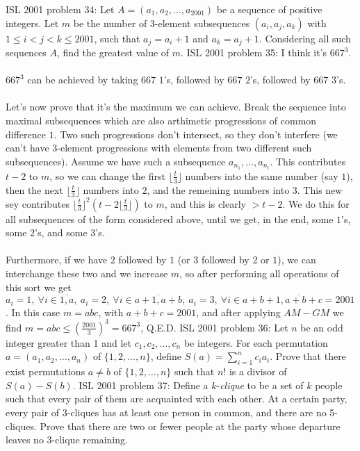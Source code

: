 ISL 2001 problem 34:  Let $A = (a_1, a_2, \ldots, a_{2001})$ be a sequence of positive integers. Let $m$ be the number of 3-element subsequences $(a_i,a_j,a_k)$ with $1 \leq i < j < k \leq 2001$, such that $a_j = a_i + 1$ and $a_k = a_j + 1$.  Considering all such sequences $A$, find the greatest value of $m$. 
ISL 2001 problem 35:  I think it's $667^3$. \\\\
$667^3$ can be achieved by taking $667$ $1$'s, followed by $667$ $2$'s, followed by $667$ $3$'s. \\\\
Let's now prove that it's the maximum we can achieve. Break the sequence into maximal subsequences which are also arthimetic progressions of common difference $1$. Two such progressions don't intersect, so they don't interfere (we can't have $3$-element progressions with elements from two different such subsequences). Assume we have such a subsequence $a_{n_1},\ldots,a_{n_t}$. This contributes $t-2$ to $m$, so we can change the first $\lfloor\frac t3 \rfloor$ numbers into the same number (say $1$), then the next $\lfloor\frac t3\rfloor$ numbers into $2$, and the remeining numbers into $3$. This new sey contributes $\lfloor\frac t3 \rfloor^2(t-2\lfloor\frac t3 \rfloor)$ to $m$, and this is clearly $>t-2$. We do this for all subsequences of the form considered above, until we get, in the end, some $1$'s, some $2$'s, and some $3$'s. \\\\
Furthermore, if we have $2$ followed by $1$ (or $3$ followed by $2$ or $1$), we can interchange these two and we increase $m$, so after performing all operations of this sort we get $a_i=1,\ \forall i\in\overline{1,a},\ a_i=2,\ \forall i\in\overline{a+1,a+b},\ a_i=3,\ \forall i\in\overline{a+b+1,a+b+c=2001}$. In this case $m=abc$, with $a+b+c=2001$, and after applying $AM-GM$ we find $m=abc\le \left(\frac{2001}3\right)^3=667^3$, Q.E.D. 
ISL 2001 problem 36:  Let $n$ be an odd integer greater than 1 and let $c_1, c_2, \ldots, c_n$ be integers. For each permutation $a = (a_1, a_2, \ldots, a_n)$ of $\{1,2,\ldots,n\}$, define $S(a) = \sum_{i=1}^n c_i a_i$. Prove that there exist permutations $a \neq b$ of $\{1,2,\ldots,n\}$ such that $n!$ is a divisor of $S(a)-S(b)$. 
ISL 2001 problem 37:  Define a $ k$-\textit{clique} to be a set of $ k$ people such that every pair of them are acquainted with each other. At a certain party, every pair of 3-cliques has at least one person in common, and there are no 5-cliques. Prove that there are two or fewer people at the party whose departure leaves no 3-clique remaining. 
